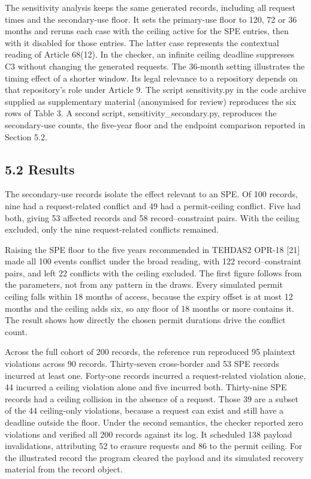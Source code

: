 \documentclass[5p,twocolumn]{elsarticle}
\begin{document}
The sensitivity analysis keeps the same generated records, including all
request times and the secondary-use floor. It sets the primary-use floor
to 120, 72 or 36 months and reruns each case with the ceiling active for
the SPE entries, then with it disabled for those entries. The latter
case represents the contextual reading of Article 68(12). In the
checker, an infinite ceiling deadline suppresses C3 without changing the
generated requests. The 36-month setting illustrates the timing effect
of a shorter window. Its legal relevance to a repository depends on that
repository's role under Article 9. The script sensitivity.py in the code
archive supplied as supplementary material (anonymised for review)
reproduces the six rows of Table 3. A second script,
sensitivity\_secondary.py, reproduces the secondary-use counts, the
five-year floor and the endpoint comparison reported in Section 5.2.

\hypertarget{results}{%
\subsection{5.2 Results}\label{results}}

The secondary-use records isolate the effect relevant to an SPE. Of 100
records, nine had a request-related conflict and 49 had a permit-ceiling
conflict. Five had both, giving 53 affected records and 58
record--constraint pairs. With the ceiling excluded, only the nine
request-related conflicts remained.

Raising the SPE floor to the five years recommended in TEHDAS2 OPR-18
{[}21{]} made all 100 events conflict under the broad reading, with 122
record--constraint pairs, and left 22 conflicts with the ceiling
excluded. The first figure follows from the parameters, not from any
pattern in the draws. Every simulated permit ceiling falls within 18
months of access, because the expiry offset is at most 12 months and the
ceiling adds six, so any floor of 18 months or more contains it. The
result shows how directly the chosen permit durations drive the conflict
count.

Across the full cohort of 200 records, the reference run reproduced 95
plaintext violations across 90 records. Thirty-seven cross-border and 53
SPE records incurred at least one. Forty-one records incurred a
request-related violation alone, 44 incurred a ceiling violation alone
and five incurred both. Thirty-nine SPE records had a ceiling collision
in the absence of a request. Those 39 are a subset of the 44
ceiling-only violations, because a request can exist and still have a
deadline outside the floor. Under the second semantics, the checker
reported zero violations and verified all 200 records against its log.
It scheduled 138 payload invalidations, attributing 52 to erasure
requests and 86 to the permit ceiling. For the illustrated record the
program cleared the payload and its simulated recovery material from the
record object.
\end{document}
